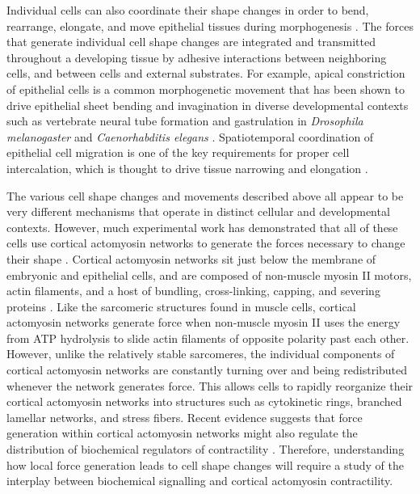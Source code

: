 \documentclass{ucetd}
\begin{document}
Individual cells can also coordinate their shape changes in order to bend, rearrange, elongate, and move epithelial tissues during morphogenesis \cite{Heisenberg:2013jk,Lecuit:2011ec}.  The forces that generate individual cell shape changes are integrated and transmitted throughout a developing tissue by adhesive interactions between neighboring cells, and between cells and external substrates.  For example, apical constriction of epithelial cells is a common morphogenetic movement that has been shown to drive epithelial sheet bending and invagination in diverse developmental contexts such as vertebrate neural tube formation and gastrulation in \textit{Drosophila melanogaster} and \textit{Caenorhabditis elegans} \cite{Sawyer:2010ku,Keller:2011dm}.  Spatiotemporal coordination of epithelial cell migration is one of the key requirements for proper cell intercalation, which is thought to drive tissue narrowing and elongation \cite{WalckShannon:2014go}.  

The various cell shape changes and movements described above all appear to be very different mechanisms that operate in distinct cellular and developmental contexts.  However, much experimental work has demonstrated that all of these cells use cortical actomyosin networks to generate the forces necessary to change their shape \cite{Lecuit:2007cw,Salbreux:2012bo}.  Cortical actomyosin networks sit just below the membrane of embryonic and epithelial cells, and are composed of non-muscle myosin II motors, actin filaments, and a host of bundling, cross-linking, capping, and severing proteins \cite{Levayer:2012bu,Murrell:2015kt}.  Like the sarcomeric structures found in muscle cells, cortical actomyosin networks generate force when non-muscle myosin II uses the energy from ATP hydrolysis to slide actin filaments of opposite polarity past each other.  However, unlike the relatively stable sarcomeres, the individual components of cortical actomyosin networks are constantly turning over and being redistributed whenever the network generates force.  This allows cells to rapidly reorganize their cortical actomyosin networks into structures such as cytokinetic rings, branched lamellar networks, and stress fibers.  Recent evidence suggests that force generation within cortical actomyosin networks might also regulate the distribution of biochemical regulators of contractility \cite{Munro:2004jk}.  Therefore, understanding how local force generation leads to cell shape changes will require a study of the interplay between biochemical signalling and cortical actomyosin contractility. 
\end{document}
